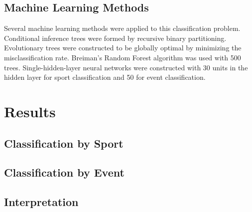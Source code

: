\documentclass[12pt,letterpaper]{article} %
\begin{document}


\subsection{Machine Learning Methods}


Several machine learning methods were applied to this classification problem. Conditional inference trees were formed by recursive binary partitioning. Evolutionary trees were constructed to be globally optimal by minimizing the misclassification rate. Breiman's Random Forest algorithm was used with 500 trees. Single-hidden-layer neural networks were constructed with 30 units in the hidden layer for sport classification and 50 for event classification.



\section{Results}

\subsection{Classification by Sport}



\subsection{Classification by Event}



\subsection{Interpretation}
\end{document}

